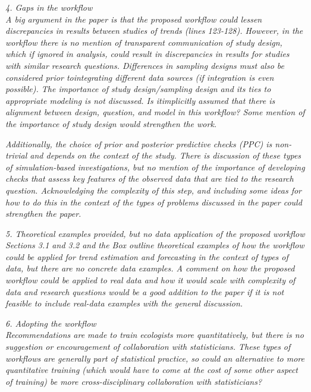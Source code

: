 \documentclass[11pt,letter]{article}
\begin{document}
\begin{mybox}
\emph{4. Gaps in the workflow\\
A big argument in the paper is that the proposed workflow
could lessen discrepancies in results between studies of trends (lines 123-128). However, in the workflow there is no mention of transparent communication of study design, which if ignored in analysis, could result in discrepancies in results for studies with similar research questions. Differences in sampling designs must also be considered prior tointegrating different data sources (if integration is even possible). The importance of study design/sampling design and its ties to appropriate modeling is not discussed. Is itimplicitly assumed that there is alignment between design, question, and model in this workflow? Some mention of the importance of study design would strengthen the work.}
\end{mybox}

\begin{mybox}
\emph{Additionally, the choice of prior and posterior predictive checks (PPC) is non-trivial and depends on the context of the study. There is discussion of these types of simulation-based investigations, but no mention of the importance of developing checks that assess key features of the observed data that are tied to the research question. Acknowledging the complexity of this step, and including some ideas for how to do this in the context of the types of problems discussed in the paper could strengthen the paper.}
\end{mybox}

\begin{mybox}
\emph{5. Theoretical examples provided, but no data application of the proposed workflow\\
Sections 3.1 and 3.2 and the Box outline theoretical examples of how the workflow could be applied for trend estimation and forecasting in the context of types of data, but there are no concrete data examples. A comment on how the proposed workflow could be applied to real data and how it would scale with complexity of data and research questions would be a good addition to the paper if it is not feasible to include real-data examples with the general discussion.}
\end{mybox}

\begin{mybox}
\emph{6. Adopting the workflow\\
Recommendations are made to train ecologists more quantitatively, but there is no suggestion or encouragement of collaboration with statisticians. These types of workflows are generally part of statistical practice, so could an alternative to more quantitative training (which would have to come at the cost of some other aspect of training) be more cross-disciplinary collaboration with statisticians?}
\end{mybox}
\end{document}
